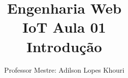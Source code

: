 \documentclass[compress, hyperref={pdfpagelayout=SinglePage}]{beamer}
\title[IoT - Aula 01]{Engenharia Web \\ IoT Aula 01 \\ Introdução}
\author{Professor Mestre: Adilson Lopes Khouri}
\begin{document}
	\begin{frame}
		\titlepage
	\end{frame}
	
	
	
	
	
	
	
	

	
				
	

	
	
\end{document}
